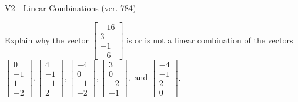 \begin{exercise}
  \begin{exerciseTitle}V2 - Linear Combinations (ver. 784)\end{exerciseTitle}
  \begin{exerciseStatement}
    Explain why the vector \(\left[\begin{array}{c}
-16 \\
3 \\
-1 \\
-6
\end{array}\right]\)  is or is not a linear 
	combination of the vectors \(\left[\begin{array}{c}
0 \\
-1 \\
1 \\
-2
\end{array}\right] , \left[\begin{array}{c}
4 \\
-1 \\
-1 \\
2
\end{array}\right] , \left[\begin{array}{c}
-4 \\
0 \\
-1 \\
-2
\end{array}\right] , \left[\begin{array}{c}
3 \\
0 \\
-2 \\
-1
\end{array}\right] , \text{ and } \left[\begin{array}{c}
-4 \\
-1 \\
2 \\
0
\end{array}\right]\).
	



\end{exerciseStatement}
\end{exercise}
